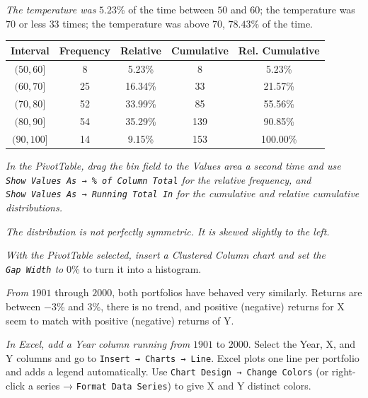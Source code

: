 \documentclass[
  11pt,
  letterpaper,
  DIV=11,
  numbers=noendperiod,
  oneside,
  open=any]{scrreprt}
\newenvironment{bsanswerkey}[2]{%
  \begin{tcolorbox}[bsbase, colback=bspaper2, colframe=bsline, fontupper=\small,
    title={\hypertarget{a-#1}{}\label{a-#1}\hyperlink{q-#1}{\textcolor{bsink2}{\MakeUppercase{#2}}}\hfill
      \hyperlink{q-#1}{\textcolor{bsaccent}{\normalfont\footnotesize back to page \pageref{q-#1}}}}]}%
  {\end{tcolorbox}}
\begin{document}
\begin{bsanswerkey}{bsans11}{Exercise 2, question 2}

\emph{The temperature was} \(5.23\)\% of the time between \(50\) and
\(60\); the temperature was \(70\) or less \(33\) times; the temperature
was above \(70\), \(78.43\)\% of the time.

\begin{center}
\begin{tabular}{ccccc}
\toprule
Interval & Frequency & Relative & Cumulative & Rel. Cumulative \\
\midrule
\((50,60]\) & 8 & 5.23\% & 8 & 5.23\% \\
\((60,70]\) & 25 & 16.34\% & 33 & 21.57\% \\
\((70,80]\) & 52 & 33.99\% & 85 & 55.56\% \\
\((80,90]\) & 54 & 35.29\% & 139 & 90.85\% \\
\((90,100]\) & 14 & 9.15\% & 153 & 100.00\% \\
\bottomrule
\end{tabular}
\end{center}

\emph{In the PivotTable, drag the bin field to the Values area a second
time and use \texttt{Show\ Values\ As\ →\ \%\ of\ Column\ Total} for the
relative frequency, and \texttt{Show\ Values\ As\ →\ Running\ Total\ In}
for the cumulative and relative cumulative distributions.}

\end{bsanswerkey}

\begin{bsanswerkey}{bsans12}{Exercise 2, question 3}

\emph{The distribution is not perfectly symmetric. It is skewed slightly
to the left.}

\emph{With the PivotTable selected, insert a Clustered Column chart and
set the \texttt{Gap\ Width} to} \(0\)\% to turn it into a histogram.

\end{bsanswerkey}

\begin{bsanswerkey}{bsans13}{Exercise 3, question 1}

\emph{From} \(1901\) through \(2000\), both portfolios have behaved very
similarly. Returns are between \(-3\)\% and \(3\)\%, there is no trend,
and positive (negative) returns for X seem to match with positive
(negative) returns of Y.

\emph{In Excel, add a Year column running from} \(1901\) to \(2000\).
Select the Year, X, and Y columns and go to
\texttt{Insert\ →\ Charts\ →\ Line}. Excel plots one line per portfolio
and adds a legend automatically. Use
\texttt{Chart\ Design\ →\ Change\ Colors} (or right-click a series →
\texttt{Format\ Data\ Series}) to give X and Y distinct colors.

\end{bsanswerkey}
\end{document}
